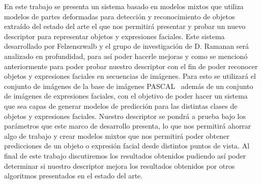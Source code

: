 \documentclass[final]{udpthesis}
\theoremstyle{definition}
\begin{document}
\begin{resumen}

En este trabajo se presenta un sistema basado en modelos mixtos que utiliza modelos de partes deformadas para detección y reconocimiento de objetos extraído del estado del arte el que nos permitirá presentar y probar un nuevo descriptor para representar objetos y expresiones faciales. Este sistema~\cite{Felzenszwalb2008,Felzenszwalb2010,Felzenszwalb2013} desarrollado por Felzenszwalb y el grupo de investigación de D. Ramanan será analizado en profundidad, para así poder hacerle mejoras y como se mencionó anteriormente para poder probar nuestro descriptor con el fin de poder reconocer objetos y expresiones faciales en secuencias de imágenes. Para esto se utilizará el conjunto de imágenes de la base de imágenes PASCAL~\cite{Everingham2010} además de un conjunto de imágenes de expresiones faciales, con el objetivo de poder hacer un sistema que sea capas de generar modelos de predicción para las distintas clases de objetos y expresiones faciales. Nuestro descriptor se pondrá a prueba bajo los parámetros que este marco de desarrollo presenta, lo que nos permitirá ahorrar algo de trabajo y crear modelos mixtos que nos permitirá poder obtener predicciones de un objeto o expresión facial desde distintos puntos de vista. Al final de este trabajo discutiremos los resultados obtenidos pudiendo así poder determinar si nuestro descriptor mejora los resultados obtenidos por otros algoritmos presentados en el estado del arte.
\end{resumen}


\mainmatter




%
%
%

\backmatter



\appendix

%
\end{document}
